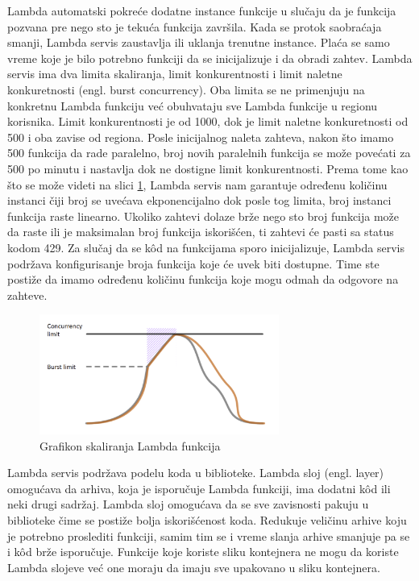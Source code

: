 \documentclass[12pt,oneside]{memoir}
\begin{document}
Lambda automatski pokreće dodatne instance funkcije u slučaju da je funkcija pozvana pre nego sto je tekuća funkcija završila. Kada se protok saobraćaja smanji, Lambda servis zaustavlja ili uklanja trenutne instance. Plaća se samo vreme koje je bilo potrebno funkciji da se inicijalizuje i da obradi zahtev. Lambda servis ima dva limita skaliranja, limit konkurentnosti i limit naletne konkuretnosti (engl. burst concurrency). Oba limita se ne primenjuju na konkretnu Lambda funkciju već obuhvataju sve Lambda funkcije u regionu korisnika. Limit konkurentnosti je od 1000, dok je limit naletne konkuretnosti od 500 i oba zavise od regiona. Posle inicijalnog naleta zahteva, nakon što imamo 500 funkcija da rade paralelno, broj novih paralelnih funkcija se može povećati za 500 po minutu i nastavlja dok ne dostigne limit konkurentnosti. Prema tome kao što se može videti na slici \ref{fig:awsLambdaSkaliranje}, Lambda servis nam garantuje određenu količinu instanci čiji broj se uvećava ekponencijalno dok posle tog limita, broj instanci funkcija raste linearno. Ukoliko zahtevi dolaze brže nego sto broj funkcija može da raste ili je maksimalan broj funkcija iskorišćen, ti zahtevi će pasti sa status kodom 429. Za slučaj da se kôd na funkcijama sporo inicijalizuje, Lambda servis podržava konfigurisanje broja funkcija koje će uvek biti dostupne. Time ste postiže da imamo određenu količinu funkcija koje mogu odmah da odgovore na zahteve.
 

\begin{figure}[!ht]
  \centering
  \includegraphics[width=0.7\textwidth]{AWS-Lambda-skaliranje.png}
  \caption{Grafikon skaliranja Lambda funkcija}
  \label{fig:awsLambdaSkaliranje}
\end{figure}
 
Lambda servis podržava podelu koda u biblioteke. Lambda sloj (engl. layer) omogućava da arhiva, koja je isporučuje Lambda funkciji, ima dodatni kôd ili neki drugi sadržaj. Lambda sloj omogućava da se sve zavisnosti pakuju u biblioteke čime se postiže bolja iskorišćenost koda. Redukuje veličinu arhive koju je potrebno proslediti funkciji, samim tim se i vreme slanja arhive smanjuje pa se i kôd brže isporučuje. Funkcije koje koriste sliku kontejnera ne mogu da koriste Lambda slojeve već one moraju da imaju sve upakovano u sliku kontejnera.
\end{document}
